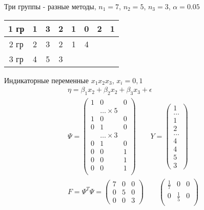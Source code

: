 \documentclass{article}
\begin{document}
\begin{eg}
  Три группы - разные методы, $n_1 = 7$, $n_2 = 5$, $n_3=3$, $\alpha=0.05$
  \begin{center}
  \begin{tabular}{| c | c | c | c | c | c | c | c |}
    \hline 
    1 гр & 1 & 3  &2 & 1 & 0 & 2 & 1 \\ 
    \hline 
    2 гр & 2 & 3 & 2 & 1 & 4 &   &   \\ 
    \hline 
    3 гр & 4 & 5 & 3 &   &   &   &   \\
    \hline 
  \end{tabular}
  \end{center}
  Индикаторные переменные $x_1x_2x_3$, $x_i=0,1$ 
  \begin{gather*}
    \eta = \beta_1x_2+\beta_2x_2+\beta_3x_3 + \epsilon \\ 
    \Psi = \begin{pmatrix}
      1 & 0 & 0 \\ 
        &\dots \times 5 &  \\ 
      1 & 0 & 0 \\
      0 & 1 & 0 \\ 
        &\dots \times 3 &  \\ 
      0 & 1 & 0 \\
      0 & 0 & 1 \\ 
      0 & 0 & 1 \\ 
      0 & 0 & 1 \\ 
    \end{pmatrix} \qquad Y = \begin{pmatrix}
      1 \\ \dots \\ 1 \\ 2 \\ \dots \\ 4 \\ 4 \\ 5 \\ 3
    \end{pmatrix} \\ 
    F=\Psi^{T}\Psi = \begin{pmatrix}
      7 & 0 & 0 \\ 
      0 & 5 & 0 \\ 
      0 & 0 & 3 
    \end{pmatrix} \qquad \begin{pmatrix}
      \frac{1}{7} & 0 & 0 \\ 
      0 & \frac{1}{5} & 0 \\ 

\end{pmatrix}
\end{gather*}
\end{eg}
\end{document}
